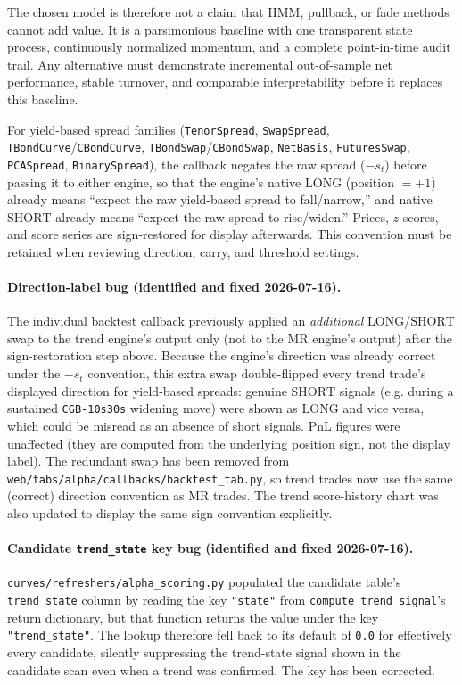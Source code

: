 The chosen model is therefore not a claim that HMM, pullback, or fade methods cannot
add value. It is a parsimonious baseline with one transparent state process,
continuously normalized momentum, and a complete point-in-time audit trail. Any
alternative must demonstrate incremental out-of-sample net performance, stable
turnover, and comparable interpretability before it replaces this baseline.

For yield-based spread families (\texttt{TenorSpread}, \texttt{SwapSpread},
\texttt{TBondCurve}/\texttt{CBondCurve}, \texttt{TBondSwap}/\texttt{CBondSwap},
\texttt{NetBasis}, \texttt{FuturesSwap}, \texttt{PCASpread}, \texttt{BinarySpread}),
the callback negates the raw spread ($-s_t$) before passing it to either engine, so
that the engine's native $\mathrm{LONG}$ (position $=+1$) already means ``expect the
raw yield-based spread to fall/narrow,'' and native $\mathrm{SHORT}$ already means
``expect the raw spread to rise/widen.'' Prices, $z$-scores, and score series are
sign-restored for display afterwards. This convention must be retained when
reviewing direction, carry, and threshold settings.

\paragraph{Direction-label bug (identified and fixed 2026-07-16).} The individual
backtest callback previously applied an \emph{additional} $\mathrm{LONG}$/$\mathrm{SHORT}$
swap to the trend engine's output only (not to the MR engine's output) after the
sign-restoration step above. Because the engine's direction was already correct
under the $-s_t$ convention, this extra swap double-flipped every trend trade's
displayed direction for yield-based spreads: genuine $\mathrm{SHORT}$ signals (e.g.
during a sustained \texttt{CGB-10s30s} widening move) were shown as $\mathrm{LONG}$
and vice versa, which could be misread as an absence of short signals. PnL figures
were unaffected (they are computed from the underlying position sign, not the
display label). The redundant swap has been removed from
\texttt{web/tabs/alpha/callbacks/backtest\_tab.py}, so trend trades now use the same
(correct) direction convention as MR trades. The trend score-history chart was also
updated to display the same sign convention explicitly.

\paragraph{Candidate \texttt{trend\_state} key bug (identified and fixed 2026-07-16).}
\texttt{curves/refreshers/alpha\_scoring.py} populated the candidate table's
\texttt{trend\_state} column by reading the key \texttt{"state"} from
\texttt{compute\_trend\_signal}'s return dictionary, but that function returns the
value under the key \texttt{"trend\_state"}. The lookup therefore fell back to its
default of \texttt{0.0} for effectively every candidate, silently suppressing the
trend-state signal shown in the candidate scan even when a trend was
confirmed. The key has been corrected.

